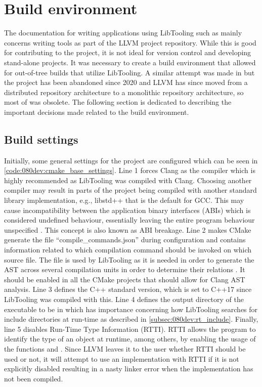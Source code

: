 \section{Build environment}

The documentation for writing applications using LibTooling such as \cite{MatchingClangAST, ClangTransformerTutorial} mainly concerns writing tools as part of the LLVM project repository. While this is good for contributing to the project, it is not ideal for version control and developing stand-alone projects.
It was necessary to create a build environment that allowed for out-of-tree builds that utilize LibTooling. A similar attempt was made in \cite{kasmisClangOutoftreeBuild2023} but the project has been abandoned since 2020 and LLVM has since moved from a distributed repository architecture to a monolithic repository architecture, so most of \cite{kasmisClangOutoftreeBuild2023} was obsolete.
The following section is dedicated to describing the important decisions made related to the build environment.

\subsection{Build settings}

Initially, some general settings for the project are configured which can be seen in \cref{code:080dev:cmake_base_settings}.
Line 1 forces Clang as the compiler which is highly recommended as LibTooling was compiled with Clang. Choosing another compiler may result in parts of the project being compiled with another standard library implementation, e.g., libstd++ that is the default for GCC. This may cause incompatibility between the application binary interfaces (ABIs) which is considered undefined behaviour, essentially leaving the entire program behaviour unspecified \cite{cppreferenceUndefinedBehaviorCppreference}. This concept is also known as ABI breakage.
Line 2 makes CMake generate the file ``compile\_commands.json'' during configuration and contains information related to which compilation command should be invoked on which source file. 
The file is used by LibTooling as it is needed in order to generate the AST across several compilation units in order to determine their relations \cite{JSONCompilationDatabase}. It should be enabled in all the CMake projects that should allow for Clang AST analysis.
Line 3 defines the C++ standard version, which is set to C++17 since LibTooling was compiled with this.
Line 4 defines the output directory of the executable to be in  which has importance concerning how LibTooling searches for include directories at run-time as described in \cref{subsec:080dev:rt_include}.
Finally, line 5 disables Run-Time Type Information (RTTI). RTTI allows the program to identify the type of an object at runtime, among others, by enabling the usage of the functions  and . Since LLVM leaves it to the user whether RTTI should be used or not, it will attempt to use an implementation with RTTI if it is not explicitly disabled resulting in a nasty linker error when the implementation has not been compiled.

